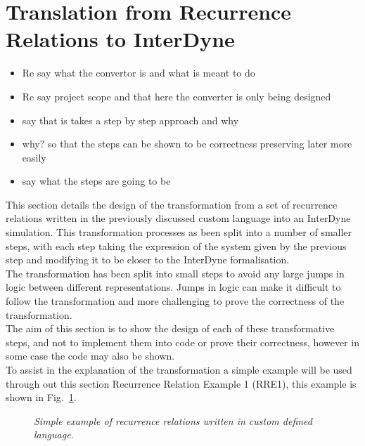 \documentclass{article}
\begin{document}
\section{Translation from Recurrence Relations to InterDyne} 

\begin{itemize}
  \item Re say what the convertor is and what is meant to do
  \item Re say project scope and that here the converter is only being designed 
  \item say that is takes a step by step approach and why 
  \item why? so that the steps can be shown to be correctness preserving later more easily 
  \item say what the steps are going to be 
\end{itemize}






This section details the design of the transformation from a set of recurrence relations written in the previously discussed custom language into an InterDyne simulation. This transformation processes  as been split into a number of smaller steps, with each step taking the expression of the system given by the previous step and modifying it to be closer to the InterDyne formalisation.\\
The transformation has been split into small steps to avoid any large jumps in logic between different representations. Jumps in logic can make it difficult to follow the transformation and more challenging to prove the correctness of the transformation.\\
The aim of this section is to show the design of each of these transformative steps, and not to implement them into code or prove their correctness, however in some case the code may also be shown.\\
To assist in the explanation of the transformation a simple example will be used through out this section Recurrence Relation Example 1 (RRE1), this example is shown in Fig.~\ref{fig:rre1}. 
\begin{figure}[H]
	\centering
	
	\caption{\it Simple example of recurrence relations written in custom defined language.}
	\label{fig:rre1}
\end{figure} 
\end{document}
